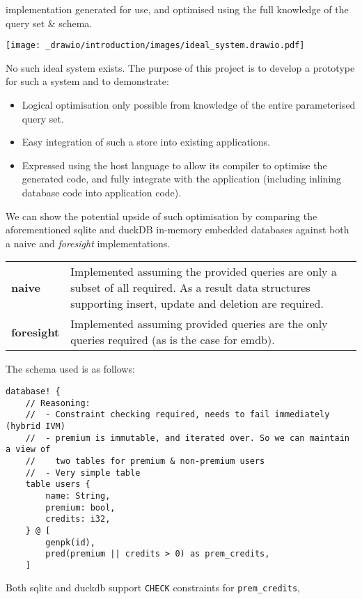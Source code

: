 implementation generated for use, and optimised using the full knowledge of the query set \& schema.
\begin{center}
    \texttt{[image: \_drawio/introduction/images/ideal\_system.drawio.pdf]}
\end{center}
\noindent
No such ideal system exists. The purpose of this project is to develop a
prototype for such a system and to demonstrate:
\begin{itemize}
    \setlength\itemsep{0em}
    \item Logical optimisation only possible from knowledge of the entire parameterised query set.
    \item Easy integration of such a store into existing applications.
    \item Expressed using the host language to allow its compiler to optimise the generated code, and fully integrate with the application (including inlining database code into application code).
\end{itemize}
We can show the potential upside of such optimisation by comparing the aforementioned sqlite and duckDB
in-memory embedded databases against both a naive and \textit{foresight} implementations.
\begin{center}
    \begin{tabular}{l p{}}
        \textbf{naive}     & Implemented assuming the provided queries are only a subset of all required. As a result data structures supporting insert, update and deletion are required. \\
        \textbf{foresight} & Implemented assuming provided queries are the only queries required (as is the case for emdb).                                                                \\
    \end{tabular}
\end{center}
The schema used is as follows:
\begin{verbatim}
database! {
    // Reasoning:
    //  - Constraint checking required, needs to fail immediately (hybrid IVM)
    //  - premium is immutable, and iterated over. So we can maintain a view of
    //    two tables for premium & non-premium users
    //  - Very simple table
    table users {
        name: String,
        premium: bool,
        credits: i32,
    } @ [
        genpk(id),
        pred(premium || credits > 0) as prem_credits,
    ]
\end{verbatim}
Both sqlite and duckdb support \texttt{CHECK} constraints for \texttt{prem_credits},
